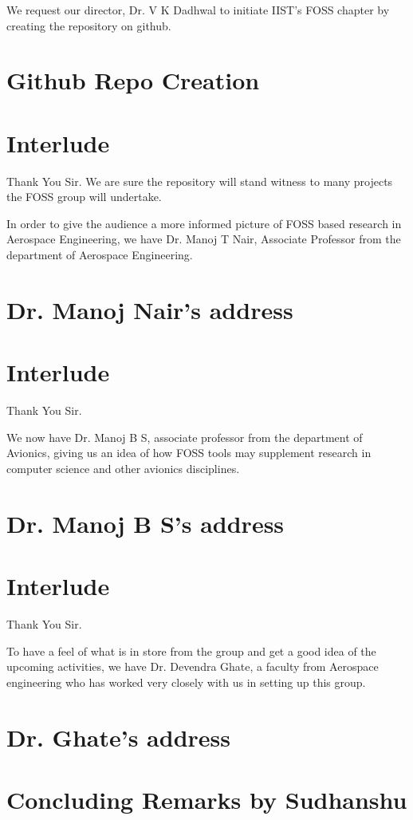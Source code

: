 \documentclass[11pt]{article}
\begin{document}
We request our director, Dr. V K Dadhwal to initiate IIST's FOSS
chapter by creating the repository on github.

\section{Github Repo Creation}
\label{sec-8}

\section{Interlude}
\label{sec-9}
Thank You Sir. We are sure the repository will stand witness to many
projects the FOSS group will undertake.

In order to give the audience a more informed picture of FOSS based
research in Aerospace Engineering, we have Dr. Manoj T Nair,
Associate Professor from the department of Aerospace Engineering.

\section{Dr. Manoj Nair's address}
\label{sec-10}

\section{Interlude}
\label{sec-11}
Thank You Sir.

We now have Dr. Manoj B S, associate professor from the department
of Avionics, giving us an idea of how FOSS tools may supplement
research in computer science and other avionics disciplines.

\section{Dr. Manoj B S's address}
\label{sec-12}

\section{Interlude}
\label{sec-13}
Thank You Sir.

To have a feel of what is in store from the group and get a good
idea of the upcoming activities, we have Dr. Devendra Ghate, a
faculty from Aerospace engineering who has worked very closely with
us in setting up this group.

\section{Dr. Ghate's address}
\label{sec-14}

\section{Concluding Remarks by Sudhanshu}
\label{sec-15}
\end{document}
